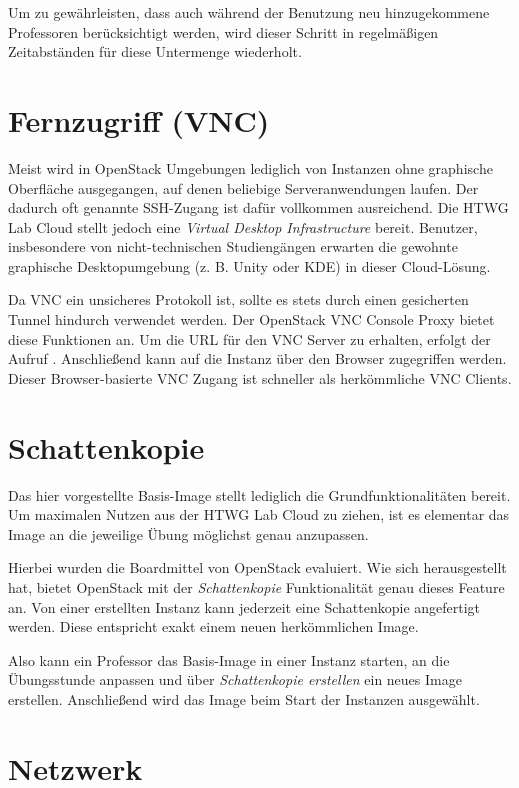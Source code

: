 Um zu gewährleisten, dass auch während der Benutzung neu hinzugekommene Professoren berücksichtigt werden, wird dieser Schritt in regelmäßigen Zeitabständen für diese Untermenge wiederholt.

\section{Fernzugriff (VNC)}\label{vnc}

Meist wird in OpenStack Umgebungen lediglich von Instanzen ohne graphische Oberfläche ausgegangen, auf denen beliebige Serveranwendungen laufen. 
Der dadurch oft genannte SSH-Zugang ist dafür vollkommen ausreichend.
Die HTWG Lab Cloud stellt jedoch eine \emph{Virtual Desktop Infrastructure} bereit.
Benutzer, insbesondere von nicht-technischen Studiengängen erwarten die gewohnte graphische Desktopumgebung (z. B. Unity oder KDE) in dieser Cloud-Lösung.

Da VNC ein unsicheres Protokoll ist, sollte es stets durch einen gesicherten Tunnel hindurch verwendet werden.
Der OpenStack VNC Console Proxy bietet diese Funktionen an.
Um die URL für den VNC Server zu erhalten, erfolgt der Aufruf .
Anschließend kann auf die Instanz über den Browser zugegriffen werden.
Dieser Browser-basierte VNC Zugang ist schneller als herkömmliche VNC Clients.

\section{Schattenkopie}

Das hier vorgestellte Basis-Image stellt lediglich die Grundfunktionalitäten bereit. 
Um maximalen Nutzen aus der HTWG Lab Cloud zu ziehen, ist es elementar das Image an die jeweilige Übung möglichst genau anzupassen.

Hierbei wurden die Boardmittel von OpenStack evaluiert.
Wie sich herausgestellt hat, bietet OpenStack mit der \emph{Schattenkopie} Funktionalität genau dieses Feature an.
Von einer erstellten Instanz kann jederzeit eine Schattenkopie angefertigt werden.
Diese entspricht exakt einem neuen herkömmlichen Image.

Also kann ein Professor das Basis-Image in einer Instanz starten, an die Übungsstunde anpassen und über \emph{Schattenkopie erstellen} ein neues Image erstellen.
Anschließend wird das Image beim Start der Instanzen ausgewählt.

\section{Netzwerk}

